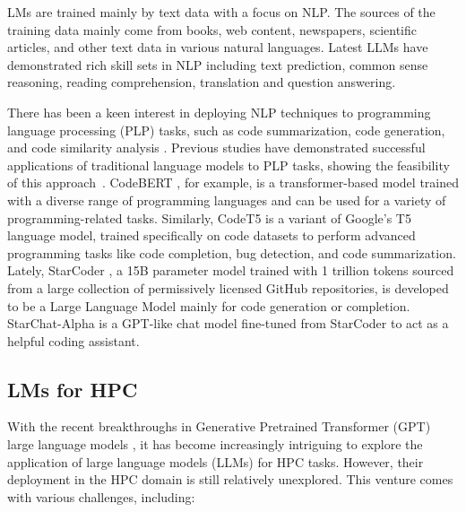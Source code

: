 LMs are trained mainly by text data with a focus on NLP.  The sources of the training data mainly come from books, web content, newspapers, scientific articles, and  other text data in various natural languages.    
 Latest LLMs have demonstrated rich skill sets in NLP including text prediction, common sense reasoning, reading comprehension, translation and question answering.

 
There has been a keen interest in deploying NLP techniques to programming language processing (PLP) tasks, such as code summarization, code generation, and code similarity analysis \cite{chen2022multi,flynn2022finding}. 
Previous studies have demonstrated successful applications of traditional language models to PLP tasks, showing the feasibility of this approach~\cite{devlin2018bert}.
CodeBERT \cite{feng2020codebert}, for example, is a transformer-based model trained with a diverse range of programming languages and can be used for a variety of programming-related tasks. Similarly, CodeT5 \cite{wang2021codet5} is a variant of Google's T5 language model, trained specifically on code datasets to perform advanced programming tasks like code completion, bug detection, and code summarization.
Lately, StarCoder \cite{li2023starcoder}, a 15B parameter model trained with 1 trillion tokens sourced from a large collection of permissively licensed GitHub repositories, is developed to be a Large Language Model mainly for code generation or completion. 
StarChat-Alpha is a GPT-like chat model fine-tuned from StarCoder to act as a helpful coding assistant. 

\vspace{-10pt}
\subsection{LMs for HPC}
With the recent breakthroughs in Generative Pretrained Transformer (GPT) large language models \cite{brown2020language}, it has become increasingly intriguing to explore the application of large language models (LLMs) for HPC tasks.
However, their deployment in the HPC domain is still relatively unexplored. This venture comes with various challenges, including:
\vspace{-4pt}

